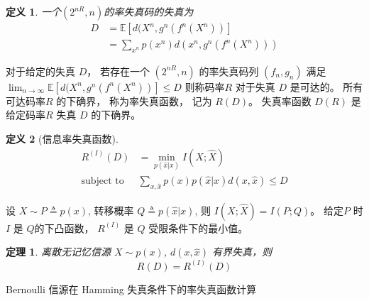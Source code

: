\documentclass{article}
\def\E{\mathbb{E}}
\newtheorem{definition}{定义}
\newtheorem{theorem}{定理}
\begin{document}
\begin{definition}
一个$ (2^{nR}, n) $的率失真码的失真为
\begin{align}
 D & = \E[ d(X^n, g^n(f^n(X^n)) ]  \nonumber \\
 & = \sum_{x^n} p(x^n) d(x^n, g^n(f^n(X^n))) 
\end{align}
\end{definition}
对于给定的失真 $D$， 若存在一个 $(2^{nR}, n) $ 的率失真码列 $(f_n, g_n)$ 满足 $ \lim_{n \to \infty} \E[ d(X^n, g^n(f^n(X^n)) ] \leq D $
则称码率$R $ 对于失真 $D$ 是可达的。 所有可达码率$R$ 的下确界， 称为率失真函数， 记为 $R(D)$。
失真率函数 $D(R)$ 是给定码率$R$ 失真 $D$ 的下确界。
\begin{definition}[信息率失真函数]
\begin{align}
R^{(I)} (D)  & = \min_{p(\widehat{x} | x) } I(X; \widehat{X})  \\
\textrm{subject to } & \sum_{ x, \widehat{x}} p(x) p(\widehat{x} | x) d(x, \widehat{x}) \leq D \nonumber
\end{align}
\end{definition}
设 $ X \sim P \triangleq p(x) $, 转移概率  $ Q \triangleq p(\widehat{x} | x) $, 则 $I(X; \widehat{X}) = I(P; Q) $。 给定$P$ 时 $I$ 是 $Q$的下凸函数，
$R^{(I)}$ 是 $Q$ 受限条件下的最小值。
\begin{theorem}
离散无记忆信源 $ X \sim p(x)$, $d(x,\widehat{x}) $ 有界失真，则 
\begin{equation}
R(D) = R^{(I)} (D) 
\end{equation}
\end{theorem}

Bernoulli 信源在 Hamming 失真条件下的率失真函数计算
\end{document}

